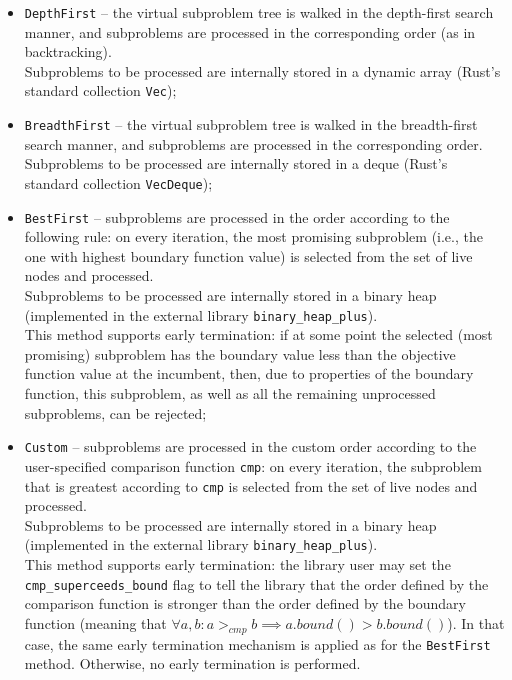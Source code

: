 \begin{itemize}
 \item \texttt{DepthFirst} -- the virtual subproblem tree is walked in the depth-first search
    manner, and subproblems are processed in the corresponding order (as in backtracking). \\
    Subproblems to be processed are internally stored in a dynamic array (Rust's standard
    collection \texttt{Vec});

 \item \texttt{BreadthFirst} -- the virtual subproblem tree is walked in the breadth-first
    search manner, and subproblems are processed in the corresponding order. \\
    Subproblems to be processed are internally stored in a deque (Rust's standard collection
    \texttt{VecDeque});

 \item \texttt{BestFirst} -- subproblems are processed in the order according to the following
    rule: on every iteration, the most promising subproblem (i.e., the one with highest
    boundary function value) is selected from the set of live nodes and processed. \\
    Subproblems to be processed are internally stored in a binary heap (implemented in the
    external library \texttt{binary\_heap\_plus}). \\
    This method supports early termination: if at some point the selected (most promising)
    subproblem has the boundary value less than the objective function value at the incumbent,
    then, due to properties of the boundary function, this subproblem, as well as all the
    remaining unprocessed subproblems, can be rejected;

 \item \texttt{Custom} -- subproblems are processed in the custom order according to the
    user-specified comparison function \texttt{cmp}: on every iteration, the subproblem that
    is greatest according to \texttt{cmp} is selected from the set of live nodes and
    processed. \\
    Subproblems to be processed are internally stored in a binary heap (implemented in the
    external library \texttt{binary\_heap\_plus}). \\
    \sloppy
    This method supports early termination: the library user may set the
    \texttt{cmp\_superceeds\_bound} flag to tell the library that the order defined by
    the comparison function is stronger than the order defined by the boundary function
    (meaning that ${\forall a, b: a >_{cmp} b \implies a.bound() > b.bound()}$).
    In that case, the same early termination mechanism is applied as for the \texttt{BestFirst}
    method. Otherwise, no early termination is performed.
\end{itemize}


